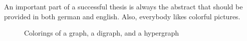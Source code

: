 
An important part of a successful thesis is always the abstract that should be provided in both german and english. Also, everybody likes colorful pictures.


\bigskip

\begin{figure}[htp!]
\centering
\resizebox{.7\linewidth}{!}{

}
\caption*{Colorings of a graph, a digraph, and a hypergraph}
\end{figure}